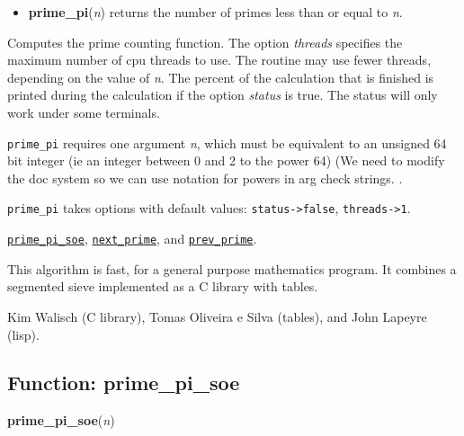 \documentclass[]{article}
\begin{document}
\vspace{5 pt}
\begin{itemize}
\item[] {\bf prime\_pi}({\it n})
  returns the number of primes less than or equal to {\it n}. 

\end{itemize}
Computes the prime counting function. The option {\it threads} specifies the maximum number of cpu threads to use. The routine may use fewer threads, depending on the value of {\it n}. The percent of the calculation that is finished is printed during the calculation if the option {\it status} is 
true. The status will only work under some terminals. 

\vspace{5 pt}

   {\tt prime\_pi} requires one argument {\it n}, which must be equivalent to an unsigned 64 bit integer
 (ie an integer between 0 and 2 to the power 64)
(We need to modify the doc system so we can use notation for powers in arg check strings.
.


\vspace{5 pt}

{\tt prime\_pi} takes options with default values: {\tt status->false}, {\tt threads->1}.
\vspace{5 pt}


  \hyperlink{prime_pi_soe}{{\tt prime\_pi\_soe}}, \hyperlink{next_prime}{{\tt next\_prime}}, and \hyperlink{prev_prime}{{\tt prev\_prime}}.

\vspace{5 pt}


This algorithm is fast, for a general purpose mathematics program. It combines a segmented sieve implemented as a C library with tables. 

\vspace{5 pt}


 Kim Walisch (C library), Tomas Oliveira e Silva (tables), and John Lapeyre (lisp).

\vspace{5 pt}


\subsection{Function: prime\_pi\_soe\label{sec:prime_pi_soe}}
\hypertarget{prime_pi_soe}{}
{\bf prime\_pi\_soe}({\it n})
\end{document}
